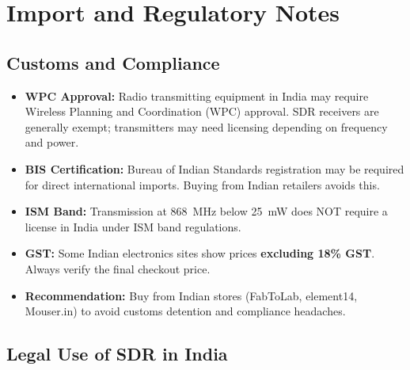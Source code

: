 \documentclass[12pt,a4paper]{article}
\begin{document}
\section{Import and Regulatory Notes}

\subsection{Customs and Compliance}

\begin{itemize}
    \item \textbf{WPC Approval:} Radio transmitting equipment in India may require 
          Wireless Planning and Coordination (WPC) approval. SDR receivers are 
          generally exempt; transmitters may need licensing depending on frequency and power.
    \item \textbf{BIS Certification:} Bureau of Indian Standards registration may be 
          required for direct international imports. Buying from Indian retailers avoids this.
    \item \textbf{ISM Band:} Transmission at 868~MHz below 25~mW does NOT require a 
          license in India under ISM band regulations.
    \item \textbf{GST:} Some Indian electronics sites show prices \textbf{excluding 18\% GST}. 
          Always verify the final checkout price.
    \item \textbf{Recommendation:} Buy from Indian stores (FabToLab, element14, Mouser.in) 
          to avoid customs detention and compliance headaches.
\end{itemize}

\subsection{Legal Use of SDR in India}
\end{document}
